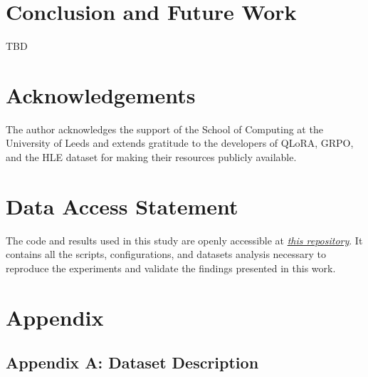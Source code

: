 \documentclass{svproc}
\begin{document}


\section{Conclusion and Future Work}
TBD



\section{Acknowledgements}
The author acknowledges the support of the School of Computing at the University of Leeds and extends gratitude to the developers of QLoRA, GRPO, and the HLE dataset for making their resources publicly available.




\section{Data Access Statement}
The code and results used in this study are openly accessible at {\it \href{https://github.com/pre63/quantized-optimization-of-mathematical-reasoning-study}{this repository}}. It contains all the scripts, configurations, and datasets analysis necessary to reproduce the experiments and validate the findings presented in this work.




\printbibliography



\section{Appendix}

\subsection{Appendix A: Dataset Description}

\begin{center}
   
\end{center}

\begin{center}
   
\end{center}

\begin{center}
   
\end{center}
\end{document}
